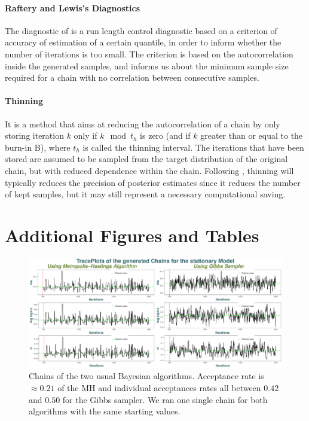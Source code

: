 \paragraph*{Raftery and Lewis’s Diagnostics}
The diagnostic of \citet{raftery1992}  is a run length control diagnostic based on a criterion of accuracy of estimation of a certain quantile, in order to inform whether the number of iterations is too small. The criterion is based on the autocorrelation inside the generated samples, and informs us about the minimum sample size required for a chain with no correlation between consecutive samples.


\paragraph*{Thinning} It is a method that aims at reducing the autocorrelation of a chain by only storing iteration $k$ only if $k\mod t_h$ is zero (and if $k$ greater than or equal to the burn-in B), where $t_h$ is called the thinning interval.
The iterations that have been stored are assumed to be sampled from the target distribution of the original chain, but with reduced dependence within the chain.
Following \citet{bay_thin_2012}, thinning will typically reduces the precision of posterior estimates since it reduces the number of kept samples, but it may still represent a necessary computational saving.



\section{Additional Figures and Tables}\label{app:bayfig}


\begin{figure}[!htb]
	\centering	\includegraphics[width=1\linewidth]{mhgib.pdf}\caption{ Chains of the two usual Bayesian algorithms. Acceptance rate is $\approx0.21$ of the MH and individual acceptances rates all between $0.42$ and $0.50$ for the Gibbs sampler. We ran one single chain for both algorithms with the same starting values.}\label{fig:mhgibbs}
\end{figure}


